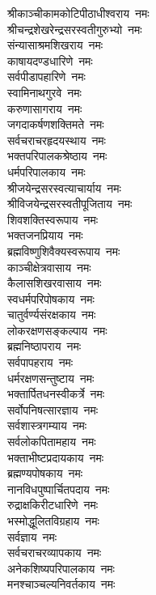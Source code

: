 \begin{flushleft}
श्रीकाञ्चीकामकोटिपीठाधीश्वराय~नमः\\
श्रीचन्द्रशेखरेन्द्रसरस्वतीगुरुभ्यो~नमः\\
संन्यासाश्रमशिखराय~नमः\\
काषायदण्डधारिणे~नमः\\
सर्वपीडापहारिणे~नमः\\
स्वामिनाथगुरवे~नमः\\
करुणासागराय~नमः\\
जगदाकर्षणशक्तिमते~नमः\\
सर्वचराचरहृदयस्थाय~नमः\\
भक्तपरिपालकश्रेष्ठाय~नमः\hfill{}\\
धर्मपरिपालकाय~नमः\\
श्रीजयेन्द्रसरस्वत्याचार्याय~नमः\\
श्रीविजयेन्द्रसरस्वतीपूजिताय~नमः\\
शिवशक्तिस्वरूपाय~नमः\\
भक्तजनप्रियाय~नमः\\
ब्रह्मविष्णुशिवैक्यस्वरूपाय~नमः\\
काञ्चीक्षेत्रवासाय~नमः\\
कैलासशिखरवासाय~नमः\\
स्वधर्मपरिपोषकाय~नमः\\
चातुर्वर्ण्यसंरक्षकाय~नमः\hfill{}\\
लोकरक्षणसङ्कल्पाय~नमः\\
ब्रह्मनिष्ठापराय~नमः\\
सर्वपापहराय~नमः\\
धर्मरक्षणसन्तुष्टाय~नमः\\
भक्तार्पितधनस्वीकर्त्रे~नमः\\
सर्वोपनिषत्सारज्ञाय~नमः\\
सर्वशास्त्रगम्याय~नमः\\
सर्वलोकपितामहाय~नमः\\
भक्ताभीष्टप्रदायकाय~नमः\\
ब्रह्मण्यपोषकाय~नमः\hfill{}\\
नानविधपुष्पार्चितपदाय~नमः\\
रुद्राक्षकिरीटधारिणे~नमः\\
भस्मोद्धूलितविग्रहाय~नमः\\
सर्वज्ञाय~नमः\\
सर्वचराचरव्यापकाय~नमः\\
अनेकशिष्यपरिपालकाय~नमः\\
मनश्चाञ्चल्यनिवर्तकाय~नमः\\

\end{flushleft}
